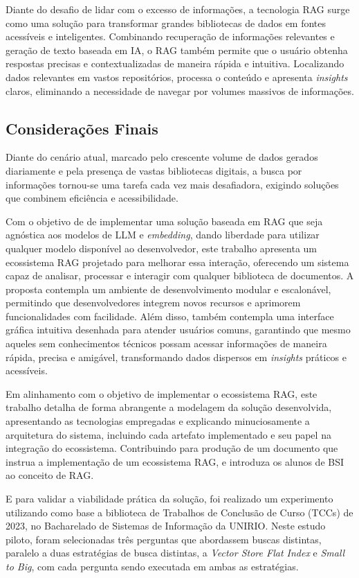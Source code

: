 \documentclass[a4paper, 12pt]{article}
\begin{document}
    Diante do desafio de lidar com o excesso de informações, a tecnologia RAG surge como uma solução para transformar grandes bibliotecas de dados em fontes acessíveis e inteligentes. Combinando recuperação de informações relevantes e geração de texto baseada em IA, o RAG também permite que o usuário obtenha respostas precisas e contextualizadas de maneira rápida e intuitiva. Localizando dados relevantes em vastos repositórios, processa o conteúdo e apresenta \textit{insights} claros, eliminando a necessidade de navegar por volumes massivos de informações.
    
    \subsection{Considerações Finais}

    Diante do cenário atual, marcado pelo crescente volume de dados gerados diariamente e pela presença de vastas bibliotecas digitais, a busca por informações tornou-se uma tarefa cada vez mais desafiadora, exigindo soluções que combinem eficiência e acessibilidade. 
    
    Com o objetivo de de implementar uma solução baseada em RAG que seja agnóstica aos modelos de LLM e \textit{embedding}, dando liberdade para utilizar qualquer modelo disponível ao desenvolvedor, este trabalho apresenta um ecossistema RAG projetado para melhorar essa interação, oferecendo um sistema capaz de analisar, processar e interagir com qualquer biblioteca de documentos. A proposta contempla um ambiente de desenvolvimento modular e escalonável, permitindo que desenvolvedores integrem novos recursos e aprimorem funcionalidades com facilidade. Além disso, também contempla uma interface gráfica intuitiva desenhada para atender usuários comuns, garantindo que mesmo aqueles sem conhecimentos técnicos possam acessar informações de maneira rápida, precisa e amigável, transformando dados dispersos em \textit{insights} práticos e acessíveis. 

    Em alinhamento com o objetivo de implementar o ecossistema RAG, este trabalho detalha de forma abrangente a modelagem da solução desenvolvida, apresentando as tecnologias empregadas e explicando minuciosamente a arquitetura do sistema, incluindo cada artefato implementado e seu papel na integração do ecossistema. Contribuindo para produção de um documento que instrua a implementação de um ecossistema RAG, e introduza os alunos de BSI ao conceito de RAG.
    
    E para validar a viabilidade prática da solução, foi realizado um experimento utilizando como base a biblioteca de Trabalhos de Conclusão de Curso (TCCs) de 2023, no Bacharelado de Sistemas de Informação da UNIRIO. Neste estudo piloto, foram selecionadas três perguntas que abordassem buscas distintas, paralelo a duas estratégias de busca distintas, a \textit{Vector Store Flat Index} e \textit{Small to Big}, com cada pergunta sendo executada em ambas as estratégias.
    
\end{document}
